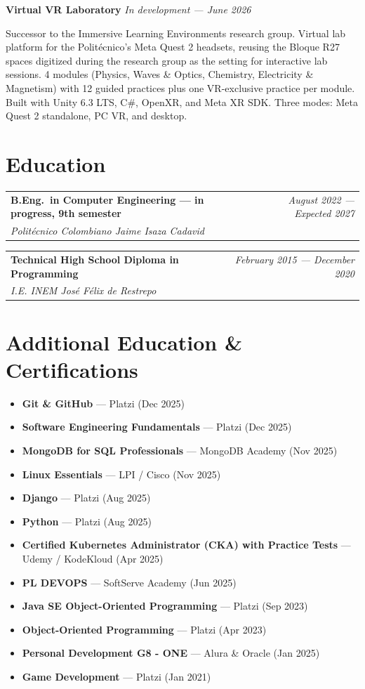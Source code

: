 \documentclass[11pt, a4paper]{article}
\makeatletter
\newcommand{\eduentry}[4]{%
  \noindent
  \begin{tabularx}{\textwidth}{@{}X r@{}}
    \textbf{#1} & \textit{\small\color{darkgray}#3 — #4} \\
    \textit{\color{darkgray}#2} & \\
  \end{tabularx}%
}
\makeatother
\begin{document}
\vspace{6pt}
\noindent\textbf{\color{primary}Virtual VR Laboratory} \hfill
\textit{\small\color{darkgray}In development — June 2026}

Successor to the Immersive Learning Environments research group. Virtual lab platform
for the Politécnico's Meta Quest 2 headsets, reusing the Bloque R27 spaces digitized
during the research group as the setting for interactive lab sessions. 4 modules
(Physics, Waves \& Optics, Chemistry, Electricity \& Magnetism) with 12 guided
practices plus one VR-exclusive practice per module. Built with Unity 6.3 LTS, C\#,
OpenXR, and Meta XR SDK. Three modes: Meta Quest 2 standalone, PC VR, and desktop.

\section{Education}

\eduentry{B.Eng.\ in Computer Engineering \textmd{--- in progress, 9th semester}}{Politécnico Colombiano Jaime Isaza Cadavid}{August 2022}{Expected 2027}

\vspace{4pt}
\eduentry{Technical High School Diploma in Programming}{I.E. INEM José Félix de Restrepo}{February 2015}{December 2020}

\section{Additional Education \& Certifications}

\begin{itemize}[itemsep=1pt]
  \item \textbf{Git \& GitHub} — Platzi (Dec 2025)
  \item \textbf{Software Engineering Fundamentals} — Platzi (Dec 2025)
  \item \textbf{MongoDB for SQL Professionals} — MongoDB Academy (Nov 2025)
  \item \textbf{Linux Essentials} — LPI / Cisco (Nov 2025)
  \item \textbf{Django} — Platzi (Aug 2025)
  \item \textbf{Python} — Platzi (Aug 2025)
  \item \textbf{Certified Kubernetes Administrator (CKA) with Practice Tests} — Udemy / KodeKloud (Apr 2025)
  \item \textbf{PL DEVOPS} — SoftServe Academy (Jun 2025)
  \item \textbf{Java SE Object-Oriented Programming} — Platzi (Sep 2023)
  \item \textbf{Object-Oriented Programming} — Platzi (Apr 2023)
  \item \textbf{Personal Development G8 - ONE} — Alura \& Oracle (Jan 2025)
  \item \textbf{Game Development} — Platzi (Jan 2021)
\end{itemize}
\end{document}
